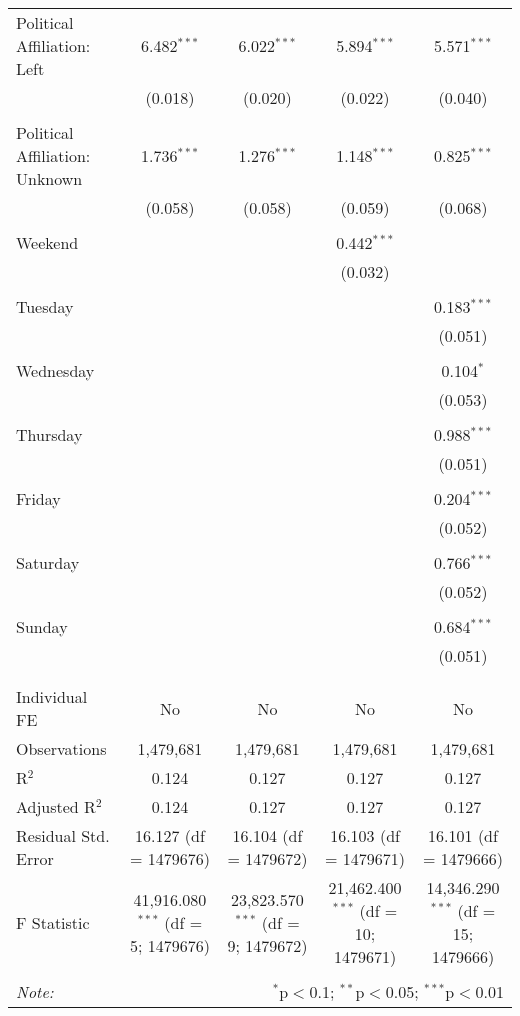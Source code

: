 \documentclass[
]{article}
\begin{document}
\begin{table}[!htbp]
{\begin{tabular}{@{\extracolsep{5pt}}lcccc}
 Political Affiliation: Left & 6.482$^{***}$ & 6.022$^{***}$ & 5.894$^{***}$ & 5.571$^{***}$ \\ 
  & (0.018) & (0.020) & (0.022) & (0.040) \\ 
  & & & & \\ 
 Political Affiliation: Unknown & 1.736$^{***}$ & 1.276$^{***}$ & 1.148$^{***}$ & 0.825$^{***}$ \\ 
  & (0.058) & (0.058) & (0.059) & (0.068) \\ 
  & & & & \\ 
 Weekend &  &  & 0.442$^{***}$ &  \\ 
  &  &  & (0.032) &  \\ 
  & & & & \\ 
 Tuesday &  &  &  & 0.183$^{***}$ \\ 
  &  &  &  & (0.051) \\ 
  & & & & \\ 
 Wednesday &  &  &  & 0.104$^{*}$ \\ 
  &  &  &  & (0.053) \\ 
  & & & & \\ 
 Thursday &  &  &  & 0.988$^{***}$ \\ 
  &  &  &  & (0.051) \\ 
  & & & & \\ 
 Friday &  &  &  & 0.204$^{***}$ \\ 
  &  &  &  & (0.052) \\ 
  & & & & \\ 
 Saturday &  &  &  & 0.766$^{***}$ \\ 
  &  &  &  & (0.052) \\ 
  & & & & \\ 
 Sunday &  &  &  & 0.684$^{***}$ \\ 
  &  &  &  & (0.051) \\ 
  & & & & \\ 
\hline \\[-1.8ex] 
Individual FE & No & No & No & No \\ 
Observations & 1,479,681 & 1,479,681 & 1,479,681 & 1,479,681 \\ 
R$^{2}$ & 0.124 & 0.127 & 0.127 & 0.127 \\ 
Adjusted R$^{2}$ & 0.124 & 0.127 & 0.127 & 0.127 \\ 
Residual Std. Error & 16.127 (df = 1479676) & 16.104 (df = 1479672) & 16.103 (df = 1479671) & 16.101 (df = 1479666) \\ 
F Statistic & 41,916.080$^{***}$ (df = 5; 1479676) & 23,823.570$^{***}$ (df = 9; 1479672) & 21,462.400$^{***}$ (df = 10; 1479671) & 14,346.290$^{***}$ (df = 15; 1479666) \\ 
\hline 
\hline \\[-1.8ex] 
\textit{Note:}  & \multicolumn{4}{r}{$^{*}$p$<$0.1; $^{**}$p$<$0.05; $^{***}$p$<$0.01} \\ 
\end{tabular}
} 
\end{table} 
\newpage
\end{document}
